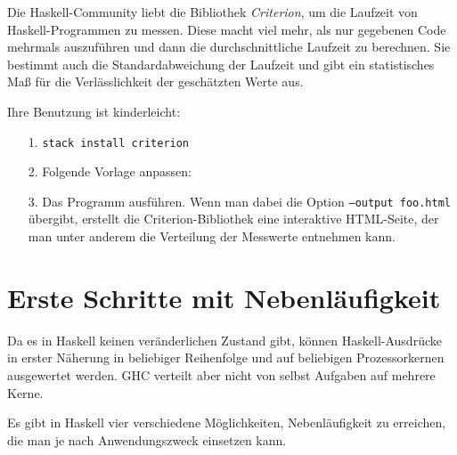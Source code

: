 \documentclass{uebblatt}
\begin{document}
Die Haskell-Community liebt die Bibliothek \emph{Criterion}, um die Laufzeit
von Haskell-Programmen zu messen. Diese macht viel mehr, als nur gegebenen Code
mehrmals auszuführen und dann die durchschnittliche Laufzeit zu berechnen. Sie
bestimmt auch die Standardabweichung der Laufzeit und gibt ein statistisches
Maß für die Verlässlichkeit der geschätzten Werte aus.

Ihre Benutzung ist kinderleicht:

\begin{enumerate}
\item[1.] \texttt{stack install criterion}
\item[2.] Folgende Vorlage anpassen:


\item[3.] Das Programm ausführen. Wenn man dabei die Option \texttt{--output
foo.html} übergibt, erstellt die Criterion-Bibliothek eine interaktive
HTML-Seite, der man unter anderem die Verteilung der Messwerte entnehmen kann.
\end{enumerate}


\section{Erste Schritte mit Nebenläufigkeit}

Da es in Haskell keinen veränderlichen Zustand gibt, können Haskell-Ausdrücke
in erster Näherung in beliebiger Reihenfolge und auf beliebigen Prozessorkernen
ausgewertet werden. GHC verteilt aber nicht von selbst Aufgaben auf mehrere
Kerne.

Es gibt in Haskell vier verschiedene Möglichkeiten, Nebenläufigkeit zu
erreichen, die man je nach Anwendungszweck einsetzen kann.
\end{document}
